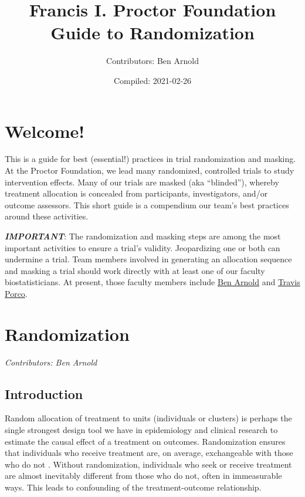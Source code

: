 \documentclass[
]{book}
\title{Francis I. Proctor Foundation Guide to Randomization}
\author{Contributors: Ben Arnold}
\date{Compiled: 2021-02-26}
\begin{document}
\maketitle

{
\setcounter{tocdepth}{1}
\tableofcontents
}
\hypertarget{welcome}{%
\chapter*{Welcome!}\label{welcome}}

This is a guide for best (essential!) practices in trial randomization and masking. At the Proctor Foundation, we lead many randomized, controlled trials to study intervention effects. Many of our trials are masked (aka ``blinded''), whereby treatment allocation is concealed from participants, investigators, and/or outcome assessors. This short guide is a compendium our team's best practices around these activities.

\emph{\textbf{IMPORTANT}}: The randomization and masking steps are among the most important activities to ensure a trial's validity. Jeopardizing one or both can undermine a trial. Team members involved in generating an allocation sequence and masking a trial should work directly with at least one of our faculty biostatisticians. At present, those faculty members include \href{https://profiles.ucsf.edu/benjamin.arnold}{Ben Arnold} and \href{https://profiles.ucsf.edu/travis.porco}{Travis Porco}.

\hypertarget{randomization}{%
\chapter{Randomization}\label{randomization}}

\emph{Contributors: Ben Arnold}

\hypertarget{randomization_intro}{%
\section{Introduction}\label{randomization_intro}}

Random allocation of treatment to units (individuals or clusters) is perhaps the single strongest design tool we have in epidemiology and clinical research to estimate the causal effect of a treatment on outcomes. Randomization ensures that individuals who receive treatment are, on average, exchangeable with those who do not \citep{Altman1999-zc}. Without randomization, individuals who seek or receive treatment are almost inevitably different from those who do not, often in immeasurable ways. This leads to confounding of the treatment-outcome relationship.
\end{document}
